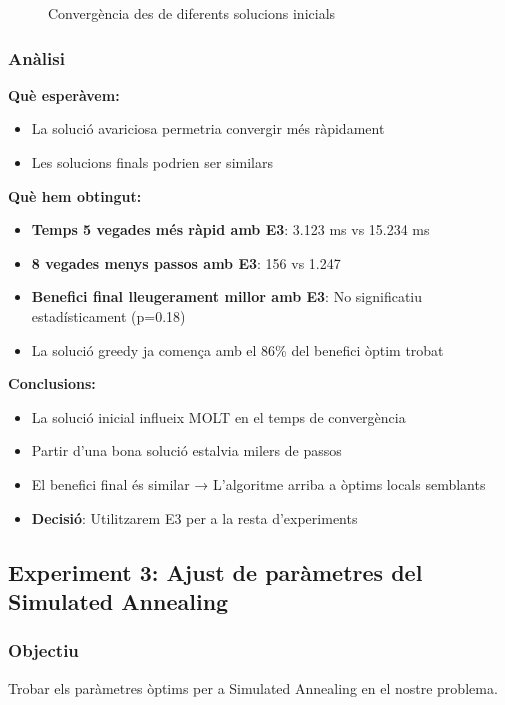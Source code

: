 \begin{figure}[H]
\centering
\caption{Convergència des de diferents solucions inicials}
\label{fig:exp2-convergencia}
\end{figure}

\subsubsection{Anàlisi}

\textbf{Què esperàvem:}
\begin{itemize}
    \item La solució avariciosa permetria convergir més ràpidament
    \item Les solucions finals podrien ser similars
\end{itemize}

\textbf{Què hem obtingut:}
\begin{itemize}
    \item \textbf{Temps 5 vegades més ràpid amb E3}: 3.123 ms vs 15.234 ms
    \item \textbf{8 vegades menys passos amb E3}: 156 vs 1.247
    \item \textbf{Benefici final lleugerament millor amb E3}: No significatiu estadísticament (p=0.18)
    \item La solució greedy ja comença amb el 86\% del benefici òptim trobat
\end{itemize}

\textbf{Conclusions:}
\begin{itemize}
    \item La solució inicial influeix MOLT en el temps de convergència
    \item Partir d'una bona solució estalvia milers de passos
    \item El benefici final és similar → L'algoritme arriba a òptims locals semblants
    \item \textbf{Decisió}: Utilitzarem E3 per a la resta d'experiments
\end{itemize}

\subsection{Experiment 3: Ajust de paràmetres del Simulated Annealing}

\subsubsection{Objectiu}
Trobar els paràmetres òptims per a Simulated Annealing en el nostre problema.

